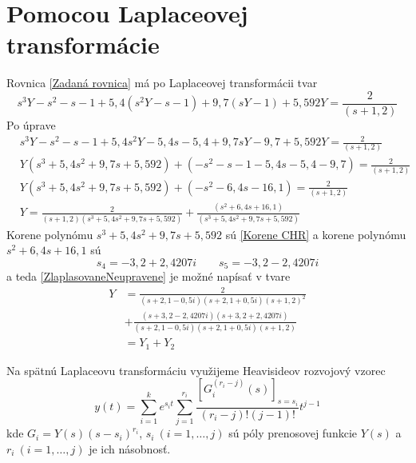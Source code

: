 \documentclass[a4paper, 10pt, ]{article}
\begin{document}
\section{Pomocou Laplaceovej transformácie}



Rovnica \eqref{Zadaná rovnica} má po Laplaceovej transformácii tvar
\begin{equation}
	s^3Y - s^2 - s - 1 + 5,4 \left( s^2Y - s - 1 \right) + 9,7 \left( sY - 1 \right) + 5,592 Y = \frac{2}{\left( s+1,2 \right)}
\end{equation}
Po úprave
\begin{subequations}
	\begin{align}
		& s^3Y - s^2 - s - 1 + 5,4s^2Y - 5,4s - 5,4 + 9,7sY - 9,7 + 5,592 Y = \frac{2}{\left( s+1,2 \right)} \\
		& Y \left( s^3 + 5,4s^2 + 9,7s + 5,592 \right) + \left( - s^2 - s - 1 - 5,4s - 5,4 - 9,7  \right) = \frac{2}{\left( s+1,2 \right)} \\
		& Y \left( s^3 + 5,4s^2 + 9,7s + 5,592 \right) + \left( - s^2 - 6,4s - 16,1 \right) = \frac{2}{\left( s+1,2 \right)} \\
		& Y = \frac{2}{\left( s+1,2 \right) \left( s^3 + 5,4s^2 + 9,7s + 5,592 \right)} + \frac{\left(  s^2 + 6,4s + 16,1 \right)}{ \left( s^3 + 5,4s^2 + 9,7s + 5,592 \right)} \label{ZlaplasovaneNeupravene}
	\end{align}
\end{subequations}
Korene polynómu $s^3 + 5,4s^2 + 9,7s + 5,592$ sú \eqref{Korene CHR} a korene polynómu $s^2 + 6,4s + 16,1$ sú
\begin{equation} \label{Korene citatela vlastnejZ}
		s_4 = -3,2 + 2,4207i \qquad
		s_5 = -3,2 - 2,4207i
\end{equation}
a teda \eqref{ZlaplasovaneNeupravene} je možné napísať v tvare
\begin{equation}
	\begin{split}
		Y &= \frac{2}{\left( s+2,1-0,5i \right)\left( s+2,1+0,5i \right)\left( s+1,2 \right)^2 } \\&+ \frac{\left(  s +3,2 - 2,4207i \right)\left(  s +3,2 + 2,4207i \right)}{ \left( s+2,1-0,5i \right)\left( s+2,1+0,5i \right)\left( s+1,2 \right)} \\
		 & = Y_1 + Y_2
	\end{split}
\end{equation}






Na spätnú Laplaceovu transformáciu využijeme Heavisideov rozvojový vzorec
\begin{equation} \label{Heavisideov rozvojový vzorec}
	y(t) = \sum_{i=1}^k e^{s_i t} \sum_{j=1}^{r_i} \frac{\left[ G_i^{(r_i-j)} (s) \right]_{s = s_i}}{(r_i - j)!(j - 1)!}t^{j-1}
\end{equation}
kde $G_i = Y(s) \left( s - s_i \right)^{r_i}$, $s_i \  (i = 1, \ldots, j)$ sú póly prenosovej funkcie $Y(s)$ a $r_i \  (i = 1, \ldots, j)$ je ich násobnosť.
\end{document}
